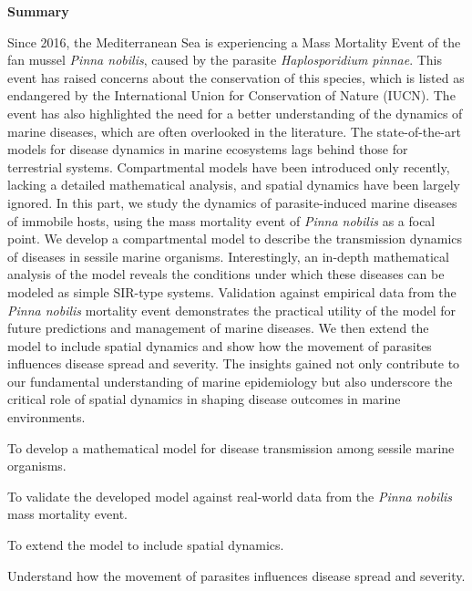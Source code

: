 \thispagestyle{empty}

\begin{center}
  \textbf{\Large Summary}
\end{center}

Since 2016, the Mediterranean Sea is experiencing a Mass Mortality Event of the
fan mussel \textit{Pinna nobilis}, caused by the
parasite \textit{Haplosporidium pinnae}. This event has raised concerns about
the conservation of this species, which is listed as endangered by the
International Union for Conservation of Nature (IUCN). The event has also
highlighted the need for a better understanding of the dynamics of marine
diseases, which are often overlooked in the literature. The state-of-the-art
models for disease dynamics in marine ecosystems lags behind those for
terrestrial systems. Compartmental models have been introduced only recently,
lacking a detailed mathematical analysis, and spatial dynamics have been
largely ignored. In this part, we study the dynamics of parasite-induced marine
diseases of immobile hosts, using the mass mortality event of \textit{Pinna
  nobilis} as a focal point. We develop a compartmental model to describe the
transmission dynamics of diseases in sessile marine organisms. Interestingly,
an in-depth mathematical analysis of the model reveals the conditions under
which these diseases can be modeled as simple SIR-type systems. Validation
against empirical data from the \textit{Pinna nobilis} mortality event
demonstrates the practical utility of the model for future predictions
and management of marine diseases. We then extend the model to include spatial
dynamics and show how the movement of parasites influences disease spread and
severity. The insights gained not only contribute to our fundamental
understanding of marine epidemiology but also underscore the critical role of
spatial dynamics in shaping disease outcomes in marine environments.

\vspace{1cm}

\begin{objectiveslist}
  \item To develop a mathematical model for disease
  transmission among sessile marine organisms.
  \item To validate the developed model against real-world data from the
  \textit{Pinna nobilis} mass mortality event.
  \item To extend the model to include spatial dynamics.
  \item Understand how the movement of parasites influences disease spread and
  severity.
\end{objectiveslist}

